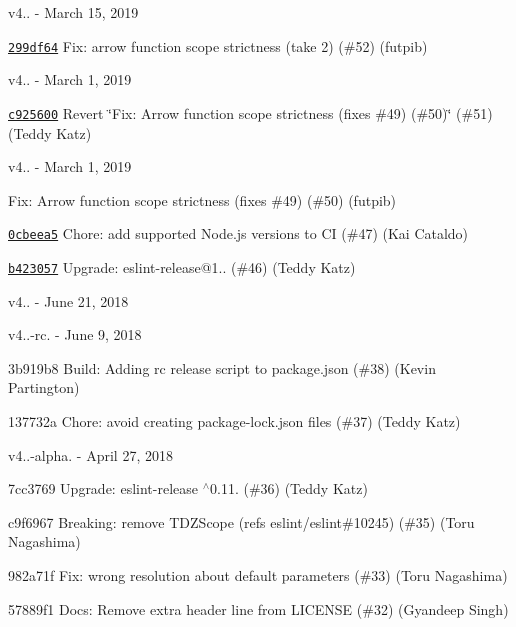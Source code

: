 v4.. -\/ March 15, 2019


\begin{DoxyItemize}
\item \href{https://github.com/eslint/eslint-scope/commit/299df64bdafb30b4d9372e4b7af0cf51a3818c4a}{\texttt{ {\ttfamily 299df64}}} Fix\+: arrow function scope strictness (take 2) (\#52) (futpib)
\end{DoxyItemize}

v4.. -\/ March 1, 2019


\begin{DoxyItemize}
\item \href{https://github.com/eslint/eslint-scope/commit/c925600a684ae0f71b96f85339437a43b4d50d99}{\texttt{ {\ttfamily c925600}}} Revert \char`\"{}\+Fix\+: Arrow function scope strictness (fixes \#49) (\#50)\char`\"{} (\#51) (Teddy Katz)
\end{DoxyItemize}

v4.. -\/ March 1, 2019


\begin{DoxyItemize}
\item \href{https://github.com/eslint/eslint-scope/commit/2533966faf317df5a3847fab937ba462c16808b8}{\texttt{ {}}} Fix\+: Arrow function scope strictness (fixes \#49) (\#50) (futpib)
\item \href{https://github.com/eslint/eslint-scope/commit/0cbeea51dfb66ab88ea34b0e3b4ad5e6cc210f2f}{\texttt{ {\ttfamily 0cbeea5}}} Chore\+: add supported Node.\+js versions to CI (\#47) (Kai Cataldo)
\item \href{https://github.com/eslint/eslint-scope/commit/b42305760638b8edf4667acf1445e450869bd983}{\texttt{ {\ttfamily b423057}}} Upgrade\+: eslint-\/release@1.. (\#46) (Teddy Katz)
\end{DoxyItemize}

v4.. -\/ June 21, 2018

v4..-\/rc. -\/ June 9, 2018


\begin{DoxyItemize}
\item 3b919b8 Build\+: Adding rc release script to package.\+json (\#38) (Kevin Partington)
\item 137732a Chore\+: avoid creating package-\/lock.\+json files (\#37) (Teddy Katz)
\end{DoxyItemize}

v4..-\/alpha. -\/ April 27, 2018


\begin{DoxyItemize}
\item 7cc3769 Upgrade\+: eslint-\/release $^\wedge$0.11. (\#36) (Teddy Katz)
\item c9f6967 Breaking\+: remove TDZScope (refs eslint/eslint\#10245) (\#35) (Toru Nagashima)
\item 982a71f Fix\+: wrong resolution about default parameters (\#33) (Toru Nagashima)
\item 57889f1 Docs\+: Remove extra header line from LICENSE (\#32) (Gyandeep Singh)
\end{DoxyItemize}

